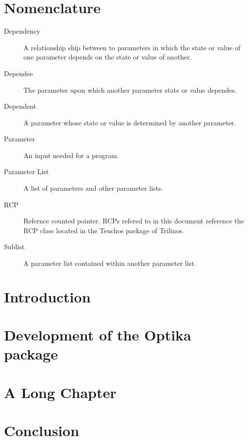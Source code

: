 \documentclass[pdf,ps2pdf,12pt,report,strict,blank]{SANDreport}
\begin{document}
    \chapter*{Nomenclature}
    \begin{description}
	\item[Dependency]
	    A relationship ship between to parameters in which the state
		or value of one parameter depends on the state or value of
		another.
	\item[Dependee]
		The parameter upon which another parameter state or value dependes.
	\item[Dependent]
		A parameter whose state or value is determined by another
		parameter.
	\item[Parameter]
	    An input needed for a program.
	\item[Parameter List]
	    A list of parameters and other parameter lists.
	\item[RCP]
	    Refernce counted pointer. RCPs refered to in this document reference the
		RCP class located in the Teuchos package of Trilinos.
	\item[Sublist]
	    A parameter list contained within another parameter list.
    \end{description}


    \SANDmain		%

    \chapter{Introduction}
	\label{Intro}
	


    \chapter{Development of the Optika package}
	


    \chapter{A Long Chapter}\label{sec:long}
	


    \chapter{Conclusion}
	
\end{document}
